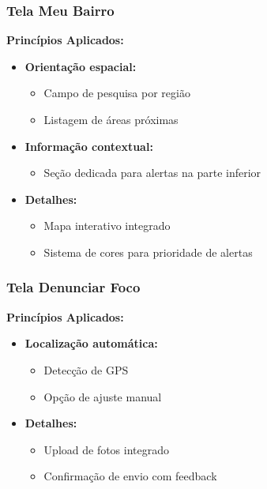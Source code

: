 \documentclass[a5paper, 12pt]{article}
\begin{document}
\subsubsection{Tela Meu Bairro}
\textbf{Princípios Aplicados:}
\begin{itemize}[leftmargin=*]
    \item \textbf{Orientação espacial:}
    \begin{itemize}
        \item Campo de pesquisa por região
        \item Listagem de áreas próximas
    \end{itemize}
    
    \item \textbf{Informação contextual:}
    \begin{itemize}
        \item Seção dedicada para alertas na parte inferior
    \end{itemize}

    \item \textbf{Detalhes:}
    \begin{itemize}
        \item Mapa interativo integrado
        \item Sistema de cores para prioridade de alertas
    \end{itemize}
\end{itemize}

\subsubsection{Tela Denunciar Foco}
\textbf{Princípios Aplicados:}
\begin{itemize}[leftmargin=*]
    \item \textbf{Localização automática:}
    \begin{itemize}
        \item Detecção de GPS
        \item Opção de ajuste manual
    \end{itemize}

    \item \textbf{Detalhes:}
    \begin{itemize}
        \item Upload de fotos integrado
        \item Confirmação de envio com feedback
    \end{itemize}
\end{itemize}
\end{document}
